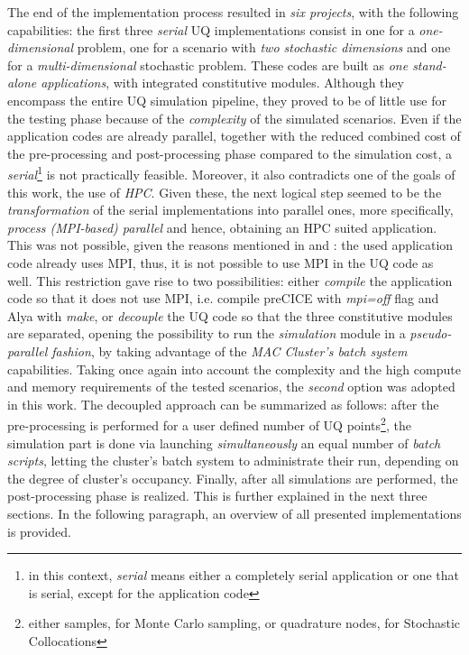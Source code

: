 	The end of the implementation process resulted in \emph{six projects}, with the following capabilities: the first three \emph{serial} UQ implementations consist in one for a \emph{one-dimensional} problem, one for a scenario with \emph{two stochastic dimensions} and one for a \emph{multi-dimensional} stochastic problem. These codes are built as \emph{one stand-alone applications}, with integrated constitutive modules.  Although they encompass the entire UQ simulation pipeline, they proved to be of little use for the testing phase because of the \emph{complexity} of the simulated scenarios. Even if the application codes are already parallel, together with the reduced combined cost of the pre-processing and post-processing phase compared to the simulation cost, a \emph{serial}\footnote{in this context, \emph{serial} means either a completely serial application or one that is serial, except for the application code} is not practically feasible. Moreover, it also contradicts one of the goals of this work, the use of \emph{HPC}. Given these, the next logical step seemed to be the \emph{transformation} of the serial implementations into parallel ones, more specifically, \emph{process (MPI-based) parallel} and hence, obtaining an HPC suited application. This was not possible, given the reasons mentioned in  and : the used application code already uses MPI, thus, it is not possible to use MPI in the UQ code as well. This restriction gave rise to two possibilities: either \emph{compile} the application code so that it does not use MPI, i.e. compile preCICE with \emph{mpi=off} flag and Alya with \emph{make}, or \emph{decouple} the UQ code so that the three constitutive modules are separated, opening the possibility to run the \emph{simulation} module in a \emph{pseudo-parallel fashion}, by taking advantage of the \emph{MAC Cluster's batch system} capabilities. Taking once again into account the complexity and the high compute and memory requirements of the tested scenarios, the \emph{second} option was adopted in this work. The decoupled approach can be summarized as follows: after the pre-processing is performed for a user defined number of UQ points\footnote{either samples, for Monte Carlo sampling, or quadrature nodes, for Stochastic Collocations}, the simulation part is done via launching \emph{simultaneously} an equal number of \emph{batch scripts}, letting the cluster's batch system to administrate their run, depending on the degree of cluster's occupancy. Finally, after all simulations are performed, the post-processing phase is realized. This is further explained in the next three sections. In the following paragraph, an overview of all presented implementations is provided.
	
